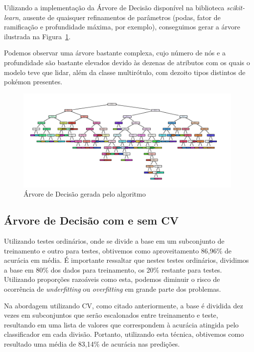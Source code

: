 \documentclass[12pt]{article}
\begin{document}
Uilizando a implementação da Árvore de Decisão disponível na biblioteca \emph{scikit-learn}, ausente de quaisquer refinamentos de parâmetros (podas, fator de ramificação e profundidade máxima, por exemplo), conseguimos gerar a árvore ilustrada na Figura~\ref{fig:exampleFig3}.

Podemos observar uma árvore bastante complexa, cujo número de nós e a profundidade são bastante elevados devido às dezenas de atributos com os quais o modelo teve que lidar, além da classe multirótulo, com dezoito tipos distintos de pokémon presentes.

\begin{figure}[H]
    \centering
    \includegraphics[width=16cm]{Images/arvore_de_decisao.png}
    \caption{Árvore de Decisão gerada pelo algoritmo}
    \label{fig:exampleFig3}
\end{figure}

\vspace{4.2cm}
\subsection{Árvore de Decisão com e sem CV}

Utilizando testes ordinários, onde se divide a base em um subconjunto de treinamento e outro para testes, obtivemos como aproveitamento 86,96\% de acurácia em média. É importante ressaltar que nestes testes ordinários, dividimos a base em 80\% dos dados para treinamento, os 20\% restante para testes. Utilizando proporções razoáveis como esta, podemos diminuir o risco de ocorrência de \emph{underfitting} ou \emph{overfitting} em grande parte dos problemas.

Na abordagem utilizando CV, como citado anteriormente, a base é dividida dez vezes em subconjuntos que serão escalonados entre treinamento e teste, resultando em uma lista de valores que correspondem à acurácia atingida pelo classificador em cada divisão. Portanto, utilizando esta técnica, obtivemos como resultado uma média de 83,14\% de acurácia nas predições. 
\end{document}
